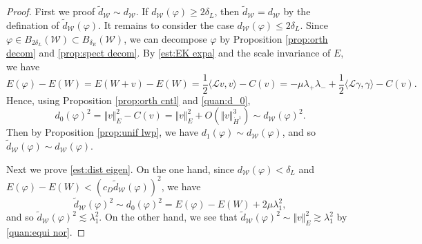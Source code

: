 \documentclass[10pt,a4paper]{amsart}
\begin{document}
	\begin{proof}
		First we proof $\widetilde{d}_{\mathcal{W}} \sim d_{\mathcal{W}}$. If $d_{\mathcal{W}}(\varphi)\geq 2\delta_L$, then $\widetilde{d}_{\mathcal{W}}=d_{\mathcal{W}}$ by the defination of $\widetilde{d}_{\mathcal{W}}(\varphi)$. It remains to consider the case $d_{\mathcal{W}}(\varphi)\leq 2\delta_L$. Since $\varphi\in B_{2\delta_L}(\mathcal{W})\subset B_{\delta_E}(\mathcal{W})$, we can  decompose $\varphi$ by Proposition \ref{prop:orth decom} and \ref{prop:spect decom}. By \eqref{est:EK expa} and the scale invariance of $E$, we have
		\begin{equation}\label{est:E expa}
		E(\varphi)-E(W)=E(W+v)-E(W)=\frac{1}{2}\langle \mathcal{L}v,v \rangle-C(v)=-\mu\lambda_+\lambda_-+\frac{1}{2}\langle \mathcal{L}\gamma,\gamma \rangle-C(v).
		\end{equation}
		Hence, using Proposition \ref{prop:orth cntl} and \eqref{quan:d_0},
		\begin{equation*}
		d_0(\varphi)^2=\Vert v \Vert_{E}^2-C(v)=\Vert v \Vert_{E}^2+O(\Vert v \Vert_{\dot H^1}^3)\sim d_{\mathcal{W}}(\varphi)^2.
		\end{equation*}
		Then by  Proposition \ref{prop:unif lwp}, we have $d_1(\varphi)\sim d_{\mathcal{W}}(\varphi)$, and so $\widetilde{d}_{\mathcal{W}}(\varphi)\sim d_{\mathcal{W}}(\varphi)$.
		
		Next we prove \eqref{est:dist eigen}. On the one hand, since $d_{\mathcal{W}}(\varphi)<\delta_{L}$ and $E(\varphi)-E(W)<(c_D\widetilde{d}_{\mathcal{W}}(\varphi))^2$, we have
		\begin{equation*}
		\widetilde{d}_{\mathcal{W}}(\varphi)^2 \sim d_0(\varphi)^2=E(\varphi)-E(W)+2\mu\lambda_{1}^2,
		\end{equation*}
		and so $\widetilde{d}_{\mathcal{W}}(\varphi)^2 \lesssim \lambda_{1}^2$. On the other hand, we see that $\widetilde{d}_{\mathcal{W}}(\varphi)^2\sim \Vert v \Vert_{E}^2 \gtrsim \lambda_{1}^2$ by \eqref{quan:equi nor}.
		

\end{proof}
\end{document}
